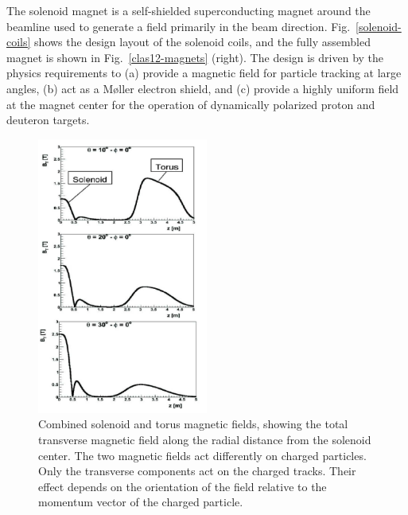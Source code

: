 \documentclass[final,3p,twocolumn]{elsarticle}
\begin{document}
The solenoid magnet is a self-shielded superconducting magnet around the beamline used to generate a field
primarily in the beam direction. Fig.~\ref{solenoid-coils} shows the design layout of the solenoid coils, and the
fully assembled magnet is shown in Fig.~\ref{clas12-magnets} (right). The design is driven by the physics
requirements to (a) provide a magnetic field for particle tracking at large angles, (b) act as a M{\o}ller electron
shield, and (c) provide a highly uniform field at the magnet center for the operation of dynamically polarized
proton and deuteron targets.

\begin{figure}[htbp!]
\centerline{\includegraphics[width=0.5\textwidth,height=0.40\textheight]{magfield.png}}
\caption{Combined solenoid and torus magnetic fields, showing the total transverse magnetic field along the
  radial distance from the solenoid center. The two magnetic fields act differently on charged particles. Only
  the transverse components act on the charged tracks. Their effect depends on the orientation of the field
  relative to the momentum vector of the charged particle.} 
\label{solenoid-torus}
\vspace{0.5cm}

\end{figure}
\end{document}
